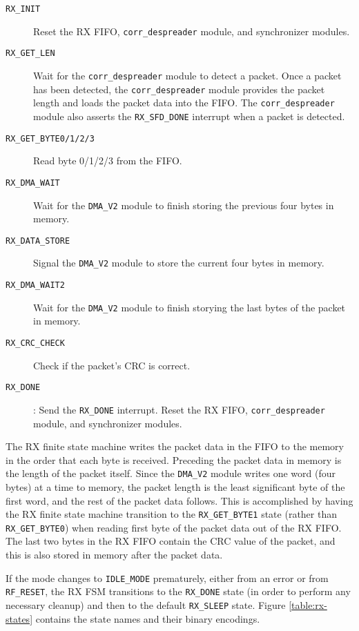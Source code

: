 \begin{description}
	\item[\texttt{RX\_INIT}] Reset the RX FIFO, \texttt{corr\_despreader} module, and synchronizer modules.
	\item[\texttt{RX\_GET\_LEN}] Wait for the \texttt{corr\_despreader} module to detect a packet. Once a packet has been detected, the \texttt{corr\_despreader} module provides the packet length and loads the packet data into the FIFO. The \texttt{corr\_despreader} module also asserts the \texttt{RX\_SFD\_DONE} interrupt when a packet is detected.
	\item[\texttt{RX\_GET\_BYTE0/1/2/3}] Read byte 0/1/2/3 from the FIFO.
	\item[\texttt{RX\_DMA\_WAIT}] Wait for the \texttt{DMA\_V2} module to finish storing the previous four bytes in memory.
	\item[\texttt{RX\_DATA\_STORE}] Signal the \texttt{DMA\_V2} module to store the current four bytes in memory.
	\item[\texttt{RX\_DMA\_WAIT2}] Wait for the \texttt{DMA\_V2} module to finish storying the last bytes of the packet in memory.
	\item[\texttt{RX\_CRC\_CHECK}] Check if the packet’s CRC is correct.
	\item[\texttt{RX\_DONE}]: Send the \texttt{RX\_DONE} interrupt. Reset the RX FIFO, \texttt{corr\_despreader} module, and synchronizer modules.
\end{description}

The RX finite state machine writes the packet data in the FIFO to the memory in the order that each byte is received. Preceding the packet data in memory is the length of the packet itself. Since the \texttt{DMA\_V2} module writes one word (four bytes) at a time to memory, the packet length is the least significant byte of the first word, and the rest of the packet data follows. This is accomplished by having the RX finite state machine transition to the \texttt{RX\_GET\_BYTE1} state (rather than \texttt{RX\_GET\_BYTE0}) when reading first byte of the packet data out of the RX FIFO. The last two bytes in the RX FIFO contain the CRC value of the packet, and this is also stored in memory after the packet data.

If the mode changes to \texttt{IDLE\_MODE} prematurely, either from an error or from \texttt{RF\_RESET}, the RX FSM transitions to the \texttt{RX\_DONE} state (in order to perform any necessary cleanup) and then to the default \texttt{RX\_SLEEP} state. Figure \ref{table:rx-states} contains the state names and their binary encodings. 

